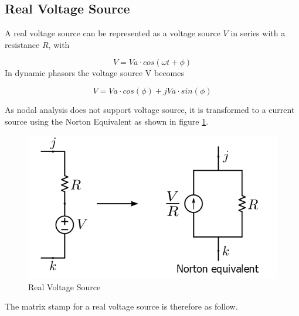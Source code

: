 \subsection{Real Voltage Source}

A real voltage source can be represented as a voltage source $V$ in series with a resistance $R$, with

\begin{equation}
V=Va \cdot cos(\omega t + \phi)
\end{equation}
In dynamic phasors the voltage source V becomes

\begin{equation}
V = Va \cdot cos (\phi) + jVa \cdot sin(\phi) 
\end{equation}

As nodal analysis does not support voltage source, it is transformed to a current source using the Norton Equivalent as shown in figure \ref{fig:Real_Voltage_Source}.

\begin{figure}[ht]
	\centering
	\includegraphics[scale=0.5]{img/VoltageSourceRes.png} 
	\caption{Real Voltage Source}
	\label{fig:Real_Voltage_Source}
\end{figure}

The matrix stamp for a real voltage source is therefore as follow.

